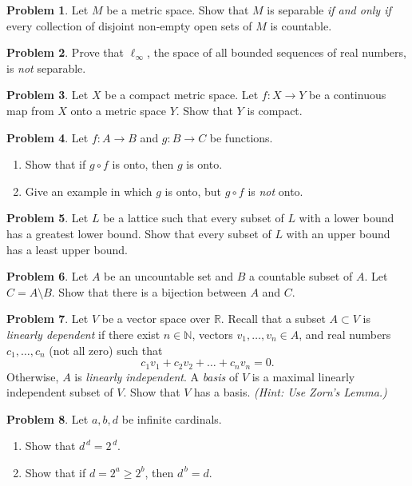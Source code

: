 \documentclass[10pt]{article}
\theoremstyle{definition} %
\newtheorem{problem}{Problem}
\theoremstyle{plain} %
\begin{document}
\begin{problem}
  Let $M$ be a metric space.  Show that $M$ is separable \emph{if and only if} every collection of disjoint non‑empty open sets of $M$ is countable.
\end{problem}

\begin{problem}
  Prove that $\ell_{\infty}$, the space of all bounded sequences of real numbers, is \emph{not} separable.
\end{problem}

\begin{problem}
  Let $X$ be a compact metric space.  Let $f : X \to Y$ be a continuous map from $X$ onto a metric space $Y$.  Show that $Y$ is compact.
\end{problem}
\begin{problem}
  Let $f : A \to B$ and $g : B \to C$ be functions.
  \begin{enumerate}[label=(\alph*)]
      \item Show that if $g \circ f$ is onto, then $g$ is onto.
      \item Give an example in which $g$ is onto, but $g \circ f$ is \emph{not} onto.
  \end{enumerate}
\end{problem}

\begin{problem}
  Let $L$ be a lattice such that every subset of $L$ with a lower bound has a greatest lower bound.
  Show that every subset of $L$ with an upper bound has a least upper bound.
\end{problem}

\begin{problem}
  Let $A$ be an uncountable set and $B$ a countable subset of $A$.  
  Let $C = A \setminus B$.  
  Show that there is a bijection between $A$ and $C$.
\end{problem}

\begin{problem}
  Let $V$ be a vector space over $\mathbb{R}$.  
  Recall that a subset $A \subset V$ is \emph{linearly dependent} if there exist $n \in \mathbb{N}$, vectors $v_{1},\dots,v_{n} \in A$, and real numbers $c_{1},\dots,c_{n}$ (not all zero) such that
  \[
      c_{1}v_{1} + c_{2}v_{2} + \dots + c_{n}v_{n} = 0.
  \]
  Otherwise, $A$ is \emph{linearly independent}.  
  A \emph{basis} of $V$ is a maximal linearly independent subset of $V$.  
  Show that $V$ has a basis.  \textit{(Hint: Use Zorn’s Lemma.)}
\end{problem}
\begin{problem}
  Let $a,b,d$ be infinite cardinals.
  \begin{enumerate}[label=(\alph*)]
      \item Show that $d^{\,d}=2^{\,d}$.
      \item Show that if $d = 2^{a} \ge 2^{b}$, then $d^{\,b}=d$.
  \end{enumerate}
\end{problem}
\end{document}
